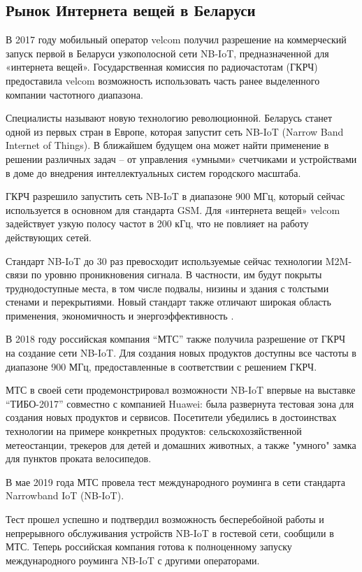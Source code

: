 \subsection{Рынок Интернета вещей в Беларуси}
\label{sec:subject:belarus}

В 2017 году мобильный оператор velcom получил разрешение на коммерческий запуск первой в Беларуси узкополосной сети NB-IoT, предназначенной для «интернета вещей». Государственная комиссия по радиочастотам (ГКРЧ) предоставила velcom возможность использовать часть ранее выделенного компании частотного диапазона.

Специалисты называют новую технологию революционной. Беларусь станет одной из первых стран в Европе, которая запустит сеть NB-IoT (Narrow Band Internet of Things). В ближайшем будущем она может найти применение в решении различных задач – от управления «умными» счетчиками и устройствами в доме до внедрения интеллектуальных систем городского масштаба.

ГКРЧ разрешило запустить сеть NB-IoT в диапазоне 900 МГц, который сейчас используется в основном для стандарта GSM. Для «интернета вещей» velcom задействует узкую полосу частот в 200 кГц, что не повлияет на работу действующих сетей.

Стандарт NB-IoT до 30 раз превосходит используемые сейчас технологии M2M-связи по уровню проникновения сигнала. В частности, им будут покрыты труднодоступные места, в том числе подвалы, низины и здания с толстыми стенами и перекрытиями. Новый стандарт также отличают широкая область применения, экономичность и энергоэффективность \cite{iot_belarus_velcom}.

В 2018 году российская компания \enquote{МТС} также получила разрешение от ГКРЧ на создание сети NB-IoT. Для создания новых продуктов доступны все частоты в диапазоне 900 МГц, предоставленные в соответствии с решением ГКРЧ.

МТС в своей сети продемонстрировал возможности NB-IoT впервые на выставке \enquote{ТИБО-2017} совместно с компанией Huawei: была развернута тестовая зона для создания новых продуктов и сервисов. Посетители убедились в достоинствах технологии на примере конкретных продуктов: сельскохозяйственной метеостанции, трекеров для детей и домашних животных, а также "умного" замка для пунктов проката велосипедов.

В мае 2019 года МТС провела тест международного роуминга в сети стандарта Narrowband IoT (NB-IoT).

Тест прошел успешно и подтвердил возможность бесперебойной работы и непрерывного обслуживания устройств NB-IoT в гостевой сети, сообщили в МТС. Теперь российская компания готова к полноценному запуску международного роуминга NB-IoT с другими операторами.


